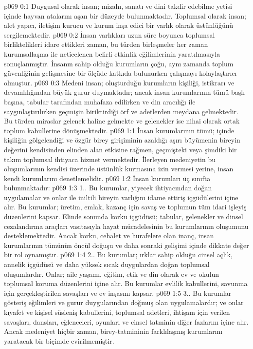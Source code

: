 \vs p069 0:1 Duygusal olarak insan; mizahı, sanatı ve dini takdir edebilme yetisi içinde hayvan atalarını aşan bir düzeyde bulunmaktadır. Toplumsal olarak insan; alet yapıcı, iletişim kurucu ve kurum inşa edici bir varlık olarak üstünlüğünü sergilemektedir.
\vs p069 0:2 İnsan varlıkları uzun süre boyunca toplumsal birliktelikleri idare ettikleri zaman, bu türden birleşmeler her zaman kurumsallaşma ile neticelenen belirli etkinlik eğilimlerinin yaratılmasıyla sonuçlanmıştır. İnsanın sahip olduğu kurumların çoğu, aynı zamanda toplum güvenliğinin gelişmesine bir ölçüde katkıda bulunurken çalışmayı kolaylaştırıcı olmuştur.
\vs p069 0:3 Medeni insan; oluşturduğu kurumların kişiliği, istikrarı ve devamlılığından büyük gurur duymaktadır; ancak insan kurumlarının tümü başlı başına, tabular tarafından muhafaza edilirken ve din aracılığı ile saygınlaştırılırken geçmişin biriktirdiği örf ve adetlerden meydana gelmektedir. Bu türden miraslar gelenek haline gelmekte ve gelenekler ise nihai olarak ortak toplum kabullerine dönüşmektedir.
\vs p069 1:1 İnsan kurumlarının tümü; içinde kişiliğin gölgelendiği ve özgür birey girişiminin azaldığı aşırı büyümenin bireyin değerini kendisinden elinden alan etkisine rağmen, geçmişteki veya şimdiki bir takım toplumsal ihtiyaca hizmet vermektedir. İlerleyen medeniyetin bu oluşumlarının kendisi üzerinde üstünlük kurmasına izin vermesi yerine, insan kendi kurumlarını denetlemelidir.
\vs p069 1:2 İnsan kurumları üç sınıfta bulunmaktadır:
\vs p069 1:3 1.\bibnobreakspace {}. Bu kurumlar, yiyecek ihtiyacından doğan uygulamalar ve onlar ile iniltili bireyin varlığını idame ettiriş içgüdülerini içine alır. Bu kurumlar; üretim, emlak, kazanç için savaş ve toplumun tüm idari işleyiş düzenlerini kapsar. Elinde sonunda korku içgüdüsü; tabular, gelenekler ve dinsel cezalandırma araçları vasıtasıyla hayat mücadelesinin bu kurumlarının oluşumunu desteklemektedir. Ancak korku, cehalet ve hurafelere olan inanç, insan kurumlarının tümünün öncül doğuşu ve daha sonraki gelişimi içinde dikkate değer bir rol oynamıştır.
\vs p069 1:4 2.\bibnobreakspace {}. Bu kurumlar; ırklar sahip olduğu cinsel açlık, annelik içgüdüsü ve daha yüksek sıcak duygulardan doğan toplumsal oluşumlardır. Onlar; aile yaşamı, eğitim, etik ve din olarak ev ve okulun toplumsal koruma düzenlerini içine alır. Bu kurumlar evlilik kabullerini, savunma için gerçekleştirilen savaşları ve ev inşasını kapsar.
\vs p069 1:5 3.\bibnobreakspace {}. Bu kurumlar gösteriş eğilimleri ve gurur duygularından doğmuş olan uygulamalardır; ve onlar kıyafet ve kişisel süsleniş kabullerini, toplumsal adetleri, ihtişam için verilen savaşları, dansları, eğlenceleri, oyunları ve cinsel tatminin diğer fazlarını içine alır. Ancak medeniyet hiçbir zaman, birey\hyp{}tatmininin farklılaşmış kurumlarını yaratacak bir biçimde evirilmemiştir.
